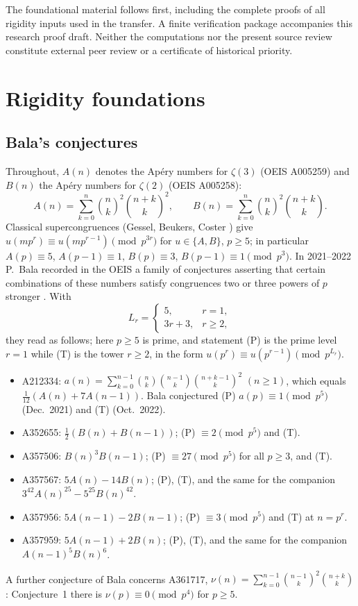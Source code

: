\documentclass[11pt]{amsart}
\theoremstyle{definition}
\theoremstyle{remark}
\newcommand{\bin}[2]{\binom{#1}{#2}}
\begin{document}
The foundational material follows first, including the complete proofs
of all rigidity inputs used in the transfer. A finite verification
package accompanies this research proof draft. Neither the computations
nor the present source review constitute external peer review or a
certificate of historical priority.

\section{Rigidity foundations}

\subsection{Bala's conjectures}
Throughout, $A(n)$ denotes the Ap\'ery numbers for $\zeta(3)$ (OEIS A005259) and $B(n)$ the
Ap\'ery numbers for $\zeta(2)$ (OEIS A005258):
\[
A(n)=\sum_{k=0}^n\bin nk^2\bin{n+k}k^2,\qquad B(n)=\sum_{k=0}^n\bin nk^2\bin{n+k}k .
\]
Classical supercongruences (Gessel, Beukers, Coster \cite{Ge,Be,Co}) give
$u(mp^r)\equiv u(mp^{r-1})\pmod{p^{3r}}$ for $u\in\{A,B\}$, $p\ge5$; in particular
$A(p)\equiv5$, $A(p-1)\equiv1$, $B(p)\equiv3$, $B(p-1)\equiv1 \pmod{p^3}$.
In 2021--2022 P.~Bala recorded in the OEIS a family of conjectures asserting that certain
combinations of these numbers satisfy congruences two or three powers of $p$ stronger
\cite{OEIS}. With
\[
L_r=\begin{cases}5,& r=1,\\ 3r+3,& r\ge 2,\end{cases}
\]
they read as follows; here $p\ge5$ is prime, and statement (P) is the prime level $r=1$
while (T) is the tower $r\ge2$, in the form $u(p^r)\equiv u(p^{r-1})\pmod{p^{L_r}}$.
\begin{itemize}
\item A212334: $a(n)=\sum_{k=0}^{n-1}\bin nk\bin{n-1}k\bin{n+k-1}k^2$ $(n\ge1)$, which equals
$\tfrac1{12}(A(n)+7A(n-1))$. Bala conjectured (P) $a(p)\equiv 1\pmod{p^5}$ (Dec.\ 2021) and
(T) (Oct.\ 2022).
\item A352655: $\tfrac12(B(n)+B(n-1))$; (P) $\equiv2\pmod{p^5}$ and (T).
\item A357506: $B(n)^3B(n-1)$; (P) $\equiv 27\pmod{p^5}$ for all $p\ge3$, and (T).
\item A357567: $5A(n)-14B(n)$; (P), (T), and the same for the companion
$3^{42}A(n)^{25}-5^{25}B(n)^{42}$.
\item A357956: $5A(n-1)-2B(n-1)$; (P) $\equiv 3\pmod{p^5}$ and (T) at $n=p^r$.
\item A357959: $5A(n-1)+2B(n)$; (P), (T), and the same for the companion $A(n-1)^5B(n)^6$.
\end{itemize}
A further conjecture of Bala concerns A361717,
$\nu(n)=\sum_{k=0}^{n-1}\bin{n-1}k^2\bin{n+k}k$: Conjecture~1 there is
$\nu(p)\equiv0\pmod{p^4}$ for $p\ge5$.
\end{document}
